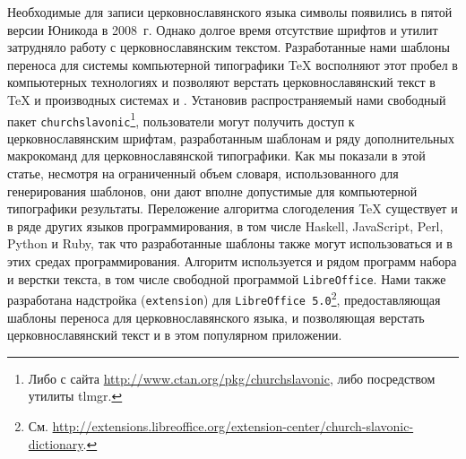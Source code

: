 \documentclass[12pt,a4paper,oneside]{extarticle}
\begin{document}
Необходимые для записи церковнославянского языка символы появились в пятой версии Юникода в 2008~г. Однако долгое время отсутствие шрифтов и утилит затрудняло работу с церковнославянским текстом. Разработанные нами шаблоны переноса для системы компьютерной типографики \TeX{} восполняют этот пробел в компьютерных технологиях и позволяют верстать церковнославянский текст в \TeX{} и производных системах \XeTeX{} и \LuaTeX{}. Установив распространяемый нами свободный пакет \texttt{churchslavonic}\footnote{Либо с сайта \url{http://www.ctan.org/pkg/churchslavonic}, либо посредством утилиты tlmgr.}, пользователи могут получить доступ к церковнославянским шрифтам, разработанным шаблонам и ряду дополнительных макрокоманд для церковнославянской типографики. Как мы показали в этой статье, несмотря на ограниченный объем словаря, использованного для генерирования шаблонов, они дают вполне допустимые для компьютерной типографики результаты. Переложение алгоритма слогоделения \TeX{}  существует и в ряде других языков программирования, в том числе Haskell, JavaScript, Perl, Python и Ruby, так что разработанные шаблоны также могут использоваться и в этих средах программирования. Алгоритм используется и рядом программ набора и верстки текста, в том числе свободной программой \verb+LibreOffice+. Нами также разработана надстройка (\verb+extension+) для \verb+LibreOffice 5.0+\footnote{См. \url{http://extensions.libreoffice.org/extension-center/church-slavonic-dictionary}.}, предоставляющая шаблоны переноса для церковнославянского языка, и позволяющая верстать церковнославянский текст и в этом популярном приложении.

\printbibliography
\end{document}
